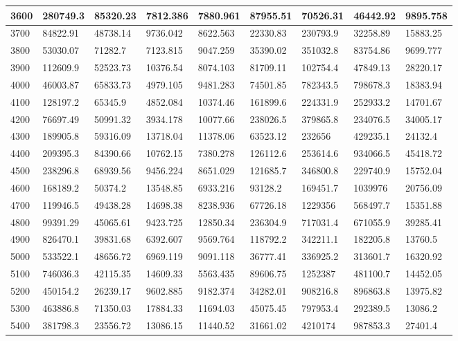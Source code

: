 \begin{table}[]
{\begin{tabular}{|l|l|l|l|l|l|l|l|l|}
3600 & 280749.3 & 85320.23 & 7812.386 & 7880.961 & 87955.51 & 70526.31 & 46442.92 & 9895.758 \\ \hline
3700 & 84822.91 & 48738.14 & 9736.042 & 8622.563 & 22330.83 & 230793.9 & 32258.89 & 15883.25 \\ \hline
3800 & 53030.07 & 71282.7 & 7123.815 & 9047.259 & 35390.02 & 351032.8 & 83754.86 & 9699.777 \\ \hline
3900 & 112609.9 & 52523.73 & 10376.54 & 8074.103 & 81709.11 & 102754.4 & 47849.13 & 28220.17 \\ \hline
4000 & 46003.87 & 65833.73 & 4979.105 & 9481.283 & 74501.85 & 782343.5 & 798678.3 & 18383.94 \\ \hline
4100 & 128197.2 & 65345.9 & 4852.084 & 10374.46 & 161899.6 & 224331.9 & 252933.2 & 14701.67 \\ \hline
4200 & 76697.49 & 50991.32 & 3934.178 & 10077.66 & 238026.5 & 379865.8 & 234076.5 & 34005.17 \\  \hline
4300 & 189905.8 & 59316.09 & 13718.04 & 11378.06 & 63523.12 & 232656 & 429235.1 & 24132.4 \\ \hline
4400 & 209395.3 & 84390.66 & 10762.15 & 7380.278 & 126112.6 & 253614.6 & 934066.5 & 45418.72 \\ \hline
4500 & 238296.8 & 68939.56 & 9456.224 & 8651.029 & 121685.7 & 346800.8 & 229740.9 & 15752.04 \\ \hline
4600 & 168189.2 & 50374.2 & 13548.85 & 6933.216 & 93128.2 & 169451.7 & 1039976 & 20756.09 \\ \hline
4700 & 119946.5 & 49438.28 & 14698.38 & 8238.936 & 67726.18 & 1229356 & 568497.7 & 15351.88 \\ \hline
4800 & 99391.29 & 45065.61 & 9423.725 & 12850.34 & 236304.9 & 717031.4 & 671055.9 & 39285.41 \\ \hline
4900 & 826470.1 & 39831.68 & 6392.607 & 9569.764 & 118792.2 & 342211.1 & 182205.8 & 13760.5 \\ \hline
5000 & 533522.1 & 48656.72 & 6969.119 & 9091.118 & 36777.41 & 336925.2 & 313601.7 & 16320.92 \\ \hline
5100 & 746036.3 & 42115.35 & 14609.33 & 5563.435 & 89606.75 & 1252387 & 481100.7 & 14452.05 \\ \hline
5200 & 450154.2 & 26239.17 & 9602.885 & 9182.374 & 34282.01 & 908216.8 & 896863.8 & 13975.82 \\ \hline
5300 & 463886.8 & 71350.03 & 17884.33 & 11694.03 & 45075.45 & 797953.4 & 292389.5 & 13086.2 \\ \hline
5400 & 381798.3 & 23556.72 & 13086.15 & 11440.52 & 31661.02 & 4210174 & 987853.3 & 27401.4 \\ \hline

\end{tabular}}
\end{table}

